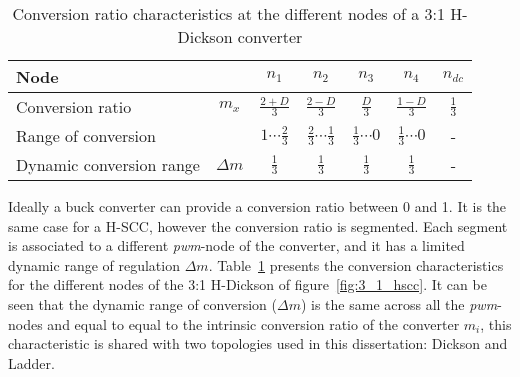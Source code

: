 %
%


\begin{table}[h]

\centering
\caption{Conversion ratio characteristics at the different nodes of a 3:1 H-Dickson converter}
\label{tab:3:1 H-Dick_M}
\renewcommand{\arraystretch}{1.5}%
\begin{tabular}{l  c | c c c c c }
 Node &  & $n_1$ & $n_2$ & $n_3$ & $n_4$ & $n_{dc}$ \\
 \midrule
 Conversion ratio & $m_x$ & $\frac{2+D}{3} $    & $\frac{2-D}{3} $ & $\frac{D}{3} $ & $\frac{1-D}{3} $ & $\frac{1}{3}$ \\
 Range of conversion &       & $1 \cdots \frac{2}{3}$ & $\frac{2}{3} \cdots \frac{1}{3} $ & $\frac{1}{3} \cdots 0$ & $\frac{1}{3} \cdots 0 $ & - \\
 Dynamic conversion range & $\Delta m$ &  $\frac{1}{3}$ &  $\frac{1}{3}$ &  $\frac{1}{3}$ &  $\frac{1}{3}$ &  -
\end{tabular}
\end{table}

Ideally a buck converter can provide a conversion ratio between 0 and 1. It is the same case for a H-SCC, however the conversion ratio is segmented. Each segment is associated to a different \emph{pwm}-node of the converter, and it has a limited dynamic range of regulation $\Delta m$. Table~\ref{tab:3:1 H-Dick_M} presents the conversion characteristics for the different nodes of the 3:1 H-Dickson of figure~\ref{fig:3_1_hscc}. It can be seen that the dynamic range of conversion ($\Delta m$) is the same across all the \emph{pwm}-nodes and equal to equal to the intrinsic conversion ratio of the converter $m_i$, this characteristic is shared with two topologies used in this dissertation: Dickson and Ladder.

